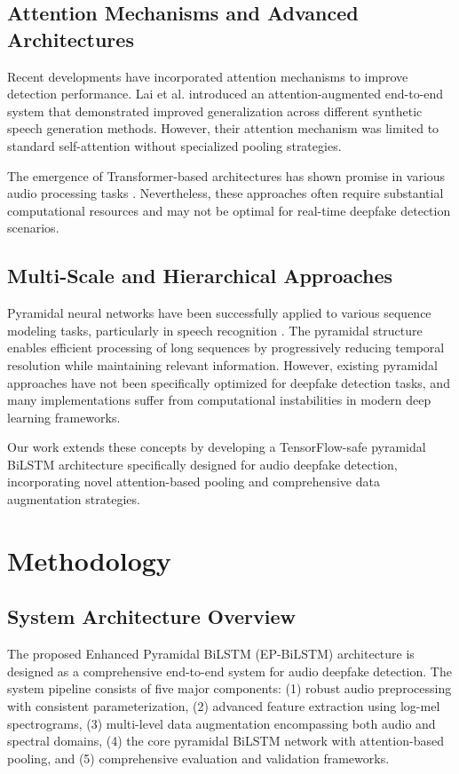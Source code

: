 \documentclass[conference]{IEEEtran}
\begin{document}
\subsection{Attention Mechanisms and Advanced Architectures}

Recent developments have incorporated attention mechanisms to improve detection performance. Lai et al. \cite{lai2019assert} introduced an attention-augmented end-to-end system that demonstrated improved generalization across different synthetic speech generation methods. However, their attention mechanism was limited to standard self-attention without specialized pooling strategies.

The emergence of Transformer-based architectures has shown promise in various audio processing tasks \cite{gong2021ast}. Nevertheless, these approaches often require substantial computational resources and may not be optimal for real-time deepfake detection scenarios.

\subsection{Multi-Scale and Hierarchical Approaches}

Pyramidal neural networks have been successfully applied to various sequence modeling tasks, particularly in speech recognition \cite{chan2016listen}. The pyramidal structure enables efficient processing of long sequences by progressively reducing temporal resolution while maintaining relevant information. However, existing pyramidal approaches have not been specifically optimized for deepfake detection tasks, and many implementations suffer from computational instabilities in modern deep learning frameworks.

Our work extends these concepts by developing a TensorFlow-safe pyramidal BiLSTM architecture specifically designed for audio deepfake detection, incorporating novel attention-based pooling and comprehensive data augmentation strategies.

\section{Methodology}

\subsection{System Architecture Overview}

The proposed Enhanced Pyramidal BiLSTM (EP-BiLSTM) architecture is designed as a comprehensive end-to-end system for audio deepfake detection. The system pipeline consists of five major components: (1) robust audio preprocessing with consistent parameterization, (2) advanced feature extraction using log-mel spectrograms, (3) multi-level data augmentation encompassing both audio and spectral domains, (4) the core pyramidal BiLSTM network with attention-based pooling, and (5) comprehensive evaluation and validation frameworks.
\end{document}

